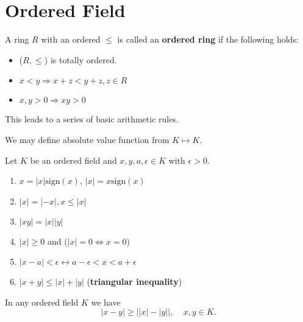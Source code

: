 \section{Ordered Field}

\begin{definition}\label{def: ordered_ring}
    A ring \(R\) with an ordered \(\leq\) is called an \textbf{ordered ring} if the following holds:
    \begin{itemize}
        \item (\(R, \leq\)) is totally ordered. 
        \item \(x < y \Rightarrow  x + z < y + z, z \in R\)
        \item \(x, y > 0 \Rightarrow  xy>0\)
    \end{itemize}
\end{definition}

\begin{note}
    This leads to a series of basic arithmetic rules. \par 
    We may define absolute value function from \(K \mapsto K\). 
\end{note}

\begin{proposition}
    Let \(K\) be an ordered field and \(x, y, a, \epsilon \in K \) with \(\epsilon > 0\). 
    \begin{enumerate}[label=(\roman*)]
        \item \(x = |x|\text{sign}\left(x\right)\), \(|x| = x\text{sign}\left(x\right)\)
        \item \(|x| = |- x|, x \leq |x|\)
        \item \(|xy| = |x||y|\)
        \item \(|x| \geq 0\) and (\(|x| = 0 \Leftrightarrow x = 0\))
        \item \(|x - a| < \epsilon \leftrightarrow a - \epsilon < x < a + \epsilon \)
        \item \(|x + y| \leq |x| + |y|\) (\textbf{triangular inequality})
    \end{enumerate}
\end{proposition}

\begin{corollary}\label{cor: reversed_tri_inequality}
    In any ordered field \(K\) we have
    \[
        |x - y| \geq \left | \left | x \right | - \left | y \right | \right |, \:\:\:\:\: x,y \in K.  
    \]
\end{corollary}


